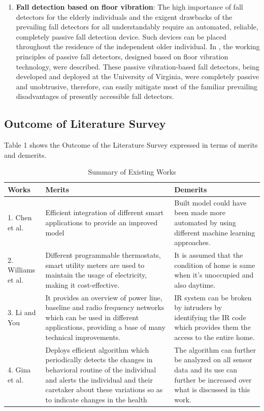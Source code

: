 \begin{enumerate}
\item  \textbf{Fall detection based on floor vibration}: The high importance of fall detectors for the elderly individuals and the exigent drawbacks of the prevailing fall detectors for all understandably require an automated, reliable, completely passive fall detection device. Such devices can be placed throughout the residence of the independent older individual. In \cite{27}, the working principles of passive fall detectors, designed based on floor vibration technology, were described. These passive vibration-based fall detectors, being developed and deployed at the University of Virginia, were completely passive and unobtrusive, therefore, can easily mitigate most of the familiar prevailing disadvantages of presently accessible fall detectors.

\end{enumerate}
\vspace*{-2cm}
\subsection{Outcome of Literature Survey}
Table 1 shows the Outcome of the Literature Survey expressed in terms of merits and demerits.
\vspace*{-1cm}
\begin{table}[H]
\caption{Summary of Existing Works}
\begin{tabular}{ | m{3cm} | m{4cm}| m{4cm} |}
\hline
\textbf{Works} & \textbf{Merits} & \textbf{Demerits} \\
\hline    
 1. Chen et al. \cite{1} & Efficient integration of different smart applications to provide an improved model & Built model could have been made more automated by using different machine learning approaches.\\ 
 \hline
 
2. Williams et al. \cite{2} & Different programmable thermostats, smart utility meters are used to maintain the usage of electricity, making it cost-effective. & It is assumed that the condition of home is same when it’s unoccupied and also daytime. \\
  \hline
3. Li and You \cite{3} & It provides an overview of power line, baseline and radio frequency networks which can be used in different applications, providing a base of many technical improvements. & IR system can be broken by intruders by identifying the IR code which provides them the access to the entire home. \\
  \hline 
4. Gina et al. \cite{17} & Deploys efficient algorithm which periodically detects the changes in behavioral routine of the individual and alerts the individual and their caretaker about these variations so as to indicate changes in the health & The algorithm can further be analyzed on all sensor data and its use can further be increased over what is discussed in this work.\\
 \hline

\end{tabular}
\end{table}

